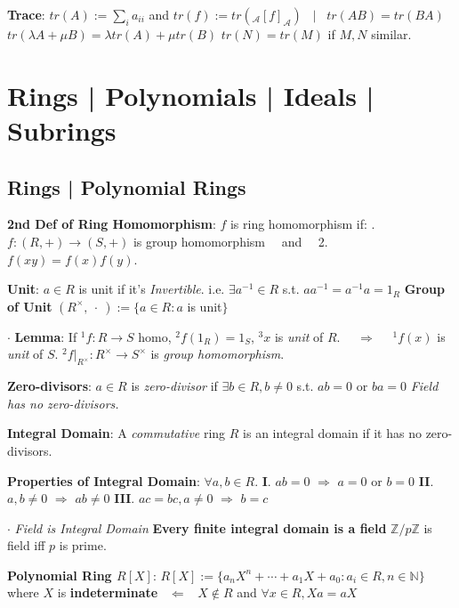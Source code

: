 \documentclass[9pt]{article}
\begin{document}
\textbf{Trace}: $tr(A):=\sum_{i}a_{ii}$ and $tr(f):=tr(_{\mathcal{A}}[f]_{\mathcal{A}})$ \ $\big|$ \ {\small $tr(AB)=tr(BA)$ \quad $tr(\lambda A+\mu B)=\lambda tr(A)+\mu tr(B)$ \quad $tr(N)=tr(M)$ if $M,N$ similar.}


\section{Rings | Polynomials | Ideals | Subrings} %

\subsection{Rings | Polynomial Rings} %

\textbf{2nd Def of Ring Homomorphism}: {\small $f$ is ring homomorphism if: . $f:(R,+)\to (S,+)$ is group homomorphism \ \ and \ \ 2. $f(xy)=f(x)f(y)$.}

\textbf{Unit}: $a\in R$ is unit if it's \textit{Invertible}. \quad i.e. $\exists a^{-1}\in R$ s.t. $aa^{-1}=a^{-1} a=1_R$ \qquad \textbf{Group of Unit} $(R^{\times},\ \cdot \ ):=\{a\in R:a$ is unit$\}$

$\cdot$ \textbf{Lemma}: If $^1f:R\to S$ homo, $^2f(1_R)=1_S$, $^3x$ is \textit{unit} of $R$. \ \ $\Rightarrow$ \ \ $^1f(x)$ is \textit{unit} of $S$. \quad $^2f|_{R^\times}:R^\times\to S^\times$ is \textit{group homomorphism}.

\textbf{Zero-divisors}: $a\in R$ is \textit{zero-divisor} if $\exists b\in R,b\ne0$ s.t. $ab=0$ or $ba=0$ \qquad \textit{Field has no zero-divisors.}  

\textbf{Integral Domain}: A \textit{commutative} ring $R$ is an integral domain if it has no zero-divisors. \qquad {}

\textbf{Properties of Integral Domain}: $\forall a,b\in R$. \quad \textbf{I}. $ab=0$ $\Rightarrow$ $a=0$ or $b=0$ \quad \textbf{II}. $a,b\ne0$ $\Rightarrow$ $ab\ne0$ \qquad \textbf{III}. $ac=bc,a\ne0$ $\Rightarrow$ $b=c$

$\cdot$ \textit{Field is Integral Domain} \qquad \textbf{Every finite integral domain is a field} \qquad $\mathbb{Z}/p\mathbb{Z}$ is field iff $p$ is prime. 

\textbf{Polynomial Ring $R[X]$}: $R[X]:=\{a_nX^n+\cdots+a_1X+a_0:a_i\in R,n\in\mathbb{N}\}$ where $X$ is \textbf{indeterminate} \ $\Leftarrow$ \ $X\notin R$ and $\forall x\in R,Xa=aX$
\end{document}
